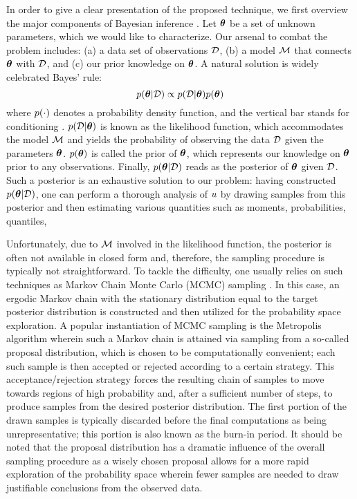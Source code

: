 In order to give a clear presentation of the proposed technique, we first overview the major components of Bayesian inference \cite{gelman2004}.
Let ${\boldsymbol\theta}$ be a set of unknown parameters, which we would like to characterize. Our arsenal to combat the problem includes: (a) a data set of observations $\mathcal{D}$, (b) a model $\model$ that connects ${\boldsymbol\theta}$ with $\mathcal{D}$, and (c) our prior knowledge on ${\boldsymbol\theta}$. A natural solution is widely celebrated Bayes' rule:
\[
  \f{\vparam | \Data} \propto \f{\Data | \vparam} \f{\vparam}
\]
where $\f{\cdot}$ denotes a probability density function, and the vertical bar stands for conditioning \cite{durrett2010}.
$\f{\Data | \vparam}$ is known as the likelihood function, which accommodates the model $\model$ and yields the probability of observing the data $\mathcal{D}$ given the parameters ${\boldsymbol\theta}$.
$\f{\vparam}$ is called the prior of ${\boldsymbol\theta}$, which represents our knowledge on ${\boldsymbol\theta}$ prior to any observations.
Finally, $\f{\vparam | \Data}$ reads as the posterior of ${\boldsymbol\theta}$ given $\mathcal{D}$. Such a posterior is an exhaustive solution to our problem: having constructed $\f{\vparam | \Data}$, one can perform a thorough analysis of $u$ by drawing samples from this posterior and then estimating various quantities such as moments, probabilities, quantiles, \etc

Unfortunately, due to $\model$ involved in the likelihood function, the posterior is often not available in closed form and, therefore, the sampling procedure is typically not straightforward.
To tackle the difficulty, one usually relies on such techniques as Markov Chain Monte Carlo (MCMC) sampling \cite{gelman2004}. In this case, an ergodic Markov chain with the stationary distribution equal to the target posterior distribution is constructed and then utilized for the probability space exploration.
A popular instantiation of MCMC sampling is the Metropolis algorithm wherein such a Markov chain is attained via sampling from a so-called proposal distribution, which is chosen to be computationally convenient; each such sample is then accepted or rejected according to a certain strategy. This acceptance/rejection strategy forces the resulting chain of samples to move towards regions of high probability and, after a sufficient number of steps, to produce samples from the desired posterior distribution. The first portion of the drawn samples is typically discarded before the final computations as being unrepresentative; this portion is also known as the burn-in period. It should be noted that the proposal distribution has a dramatic influence of the overall sampling procedure as a wisely chosen proposal allows for a more rapid exploration of the probability space wherein fewer samples are needed to draw justifiable conclusions from the observed data.
